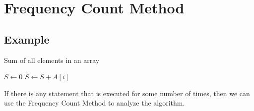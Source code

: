 \documentclass[]{article}
\begin{document}
\section{Frequency Count Method}
\subsection{Example}
\noindent
\begin{algorithm}
\caption{Sum of all elements in an array}\label{sum}
\begin{algorithmic}
\State$S \gets 0$ 
    \State$S \gets S + A[i]$
\EndFor\EndProcedure\end{algorithmic}
\end{algorithm}

If there is any statement that is executed for some number of times, then we can use the Frequency Count Method to analyze the algorithm.
\end{document}

